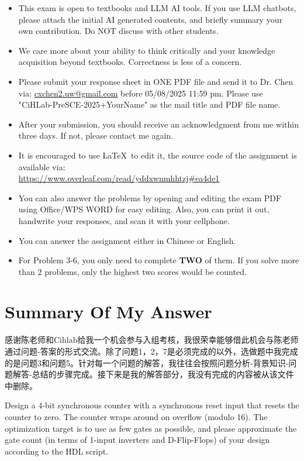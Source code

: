 \documentclass[11pt, a4 paper]{article}
\begin{document}


\begin{itemize}
    \item This exam is open to textbooks and LLM AI tools. If you use LLM chatbots, please attach the initial AI generated contents, and briefly summary your own contribution. Do NOT discuss with other students.
    \item We care more about your ability to think critically and your knowledge acquisition beyond textbooks. Correctness is less of a concern.
    \item Please submit your response sheet in ONE PDF file and send it to Dr. Chen via: \url{cxchen2.uw@gmail.com} before 05/08/2025 11:59 pm. Please use "CiHLab-PreSCE-2025+YourName" as the mail title and PDF file name. 
    \item After your submission, you should receive an acknowledgment from me within three days. If not, please contact me again. 
    \item It is encouraged to use \LaTeX~to edit it, the source code of the assignment is available via: \\
    \url{https://www.overleaf.com/read/yddxwnmhhtzj#ea4de1}
    \item You can also answer the problems by opening and editing the exam PDF using Office/WPS WORD for easy editing. Also, you can print it out, handwrite your responses, and scan it with your cellphone.
    \item You can answer the assignment either in Chinese or English. 
    \item For Problem 3-6, you only need to complete \textbf{TWO} of them. If you solve more than 2 problems, only the highest two scores would be counted.
    
\end{itemize}
\newpage
\section{Summary Of My Answer}
感谢陈老师和Cihlab给我一个机会参与入组考核，我很荣幸能够借此机会与陈老师通过问题-答案的形式交流。除了问题1，2，7是必须完成的以外，选做题中我完成的是问题3和问题5。针对每一个问题的解答，我往往会按照问题分析-背景知识-问题解答-总结的步骤完成。接下来是我的解答部分，我没有完成的内容被从该文件中删除。

Design a 4-bit synchronous counter with a synchronous reset input that resets the counter to zero. The counter wraps around on overflow (modulo 16).
The optimization target is to use as few gates as possible, and please approximate the gate count (in terms of 1-input inverters and D-Flip-Flops) of your design according to the HDL script.
\end{document}

